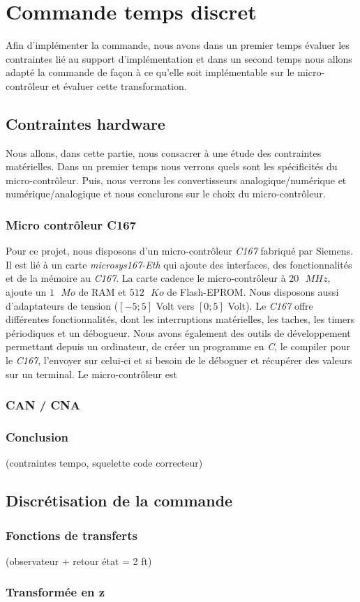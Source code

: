\chapter{Commande temps discret}
Afin d'implémenter la commande, nous avons dans un premier temps évaluer les contraintes lié au support d'implémentation et dans un second temps nous allons adapté la commande de façon à ce qu'elle soit implémentable sur le micro-contrôleur et évaluer cette transformation.

\section{Contraintes hardware} 
Nous allons, dans cette partie, nous consacrer à une étude des contraintes matérielles. Dans un premier temps nous verrons quels sont les spécificités du micro-contrôleur. Puis, nous verrons les convertisseurs analogique/numérique et numérique/analogique et nous conclurons sur le choix du micro-contrôleur. 
	\subsection{Micro contrôleur C167}
Pour ce projet, nous disposons d'un micro-contrôleur \emph{C167} fabriqué par Siemens. Il est lié à un carte \emph{microsys167-Eth} qui ajoute des interfaces, des fonctionnalités et de la mémoire au \emph{C167}. La carte cadence le micro-contrôleur à $20\text{ }MHz$, ajoute un $1\text{ }Mo$ de RAM et $512\text{ } Ko$ de Flash-EPROM. Nous disposons aussi d'adaptateurs de tension ($\left[-5;5\right]$ Volt vers $\left[0;5\right]$ Volt). Le \emph{C167} offre différentes fonctionnalités, dont les interruptions matérielles, les taches, les timers périodiques et un débogueur. Nous avons également des outils de développement permettant depuis un ordinateur, de créer un programme en \emph{C}, le compiler pour le \emph{C167}, l'envoyer sur celui-ci et si besoin de le déboguer et récupérer des valeurs sur un terminal.   Le micro-contrôleur est 
	\subsection{CAN / CNA}


	\subsection{Conclusion}
	  	(contraintes tempo, squelette code correcteur)
	  	
	  	
	  	

\section{Discrétisation de la commande}
	\subsection{Fonctions de transferts}
		 (observateur + retour état = 2 ft)
	\subsection{Transformée en z}